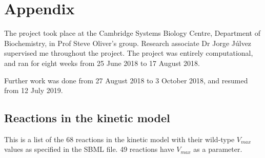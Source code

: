 \documentclass[parskip=full, numbers=noenddot]{scrreprt}
\begin{document}
\appendix
\chapter*{Appendix}
\renewcommand{\thesection}{\Alph{section}}

The project took place at the Cambridge Systems Biology Centre, Department of Biochemistry, in Prof Steve Oliver's group. Research associate Dr Jorge J\'ulvez supervised me throughout the project. The project was entirely computational, and ran for eight weeks from 25 June 2018 to 17 August 2018.

Further work was done from 27 August 2018 to 3 October 2018, and resumed from 12 July 2019.

\section{Reactions in the kinetic model}
\label{ap:kineticreactionlist}

This is a list of the 68 reactions in the kinetic model with their wild-type $V_{max}$ values as specified in the SBML file. 49 reactions have $V_{max}$ as a parameter.
\end{document}
